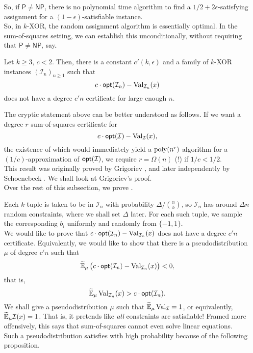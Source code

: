 	So, if $\mathsf{P} \ne \mathsf{NP}$, there is no polynomial time algorithm to find a $1/2 + 2\epsilon$-satisfying assignment for a $(1-\epsilon)$-satisfiable instance.\\
	So, in $k$-XOR, the random assignment algorithm is essentially optimal. In the sum-of-squares setting, we can establish this unconditionally, without requiring that $\mathsf{P} \ne \mathsf{NP}$, say.

	\begin{ftheo}
		\label{def:kxor-hard}
		Let $k \ge 3$, $c < 2$. Then, there is a constant $c'(k,\epsilon)$ and a family of $k$-XOR instances $(\mathcal{I}_n)_{n \ge 1}$ such that
		\[ c \cdot \mathsf{opt}(\mathcal{I}_n) - \operatorname{Val}_{\mathcal{I}_n}(x) \]
		does not have a degree $c'n$ certificate for large enough $n$.
	\end{ftheo}

	The cryptic statement above can be better understood as follows. If we want a degree $r$ sum-of-squares certificate for
	\[ c \cdot \mathsf{opt}(\mathcal{I}) - \operatorname{Val}_\mathcal{I}(x), \]
	the existence of which would immediately yield a $\operatorname{poly}(n^r)$ algorithm for a $(1/c)$-approximation of $\mathsf{opt}(\mathcal{I})$, we require $r = \Omega(n)$ (!) if $1/c < 1/2$.\\
	This result was originally proved by Grigoriev \cite{grigoriev-kxor-positivstellensatz}, and later independently by Schoenebeck \cite{schoenebeck-kxor}. We shall look at Grigoriev's proof.\\
	Over the rest of this subsection, we prove .

	Each $k$-tuple is taken to be in $\mathcal{I}_n$ with probability $\Delta/\binom{n}{k}$, so $\mathcal{I}_n$ has around $\Delta n$ random constraints, where we shall set $\Delta$ later. For each such tuple, we sample the corresponding $b_i$ uniformly and randomly from $\{-1,1\}$.\\
	We would like to prove that $c \cdot \mathsf{opt}(\mathcal{I}_n) - \operatorname{Val}_{\mathcal{I}_n}(x)$ does not have a degree $c'n$ certificate. Equivalently, we would like to show that there is a pseudodistribution $\mu$ of degree $c'n$ such that
	\[ \widetilde{\mathbb{E}}_\mu \left(c \cdot \mathsf{opt}(\mathcal{I}_n) - \operatorname{Val}_{\mathcal{I}_n}(x)\right) < 0, \]
	that is,
	\begin{equation}
		\label{eq:grig-pd}
		\widetilde{\mathbb{E}}_\mu \operatorname{Val}_{\mathcal{I}_n}(x) > c \cdot \mathsf{opt}(\mathcal{I}_n).
	\end{equation}
	We shall give a pseudodistribution $\mu$ such that $\widetilde{\mathbb{E}}_\mu \operatorname{Val}_\mathcal{I} = 1$, or equivalently, $\widetilde{\mathbb{E}}_\mu \mathcal{I}(x) = 1$. That is, it pretends like \emph{all} constraints are satisfiable! Framed more offensively, this says that sum-of-squares cannot even solve linear equations.\\
	Such a pseudodistribution satisfies  with high probability because of the following proposition.

